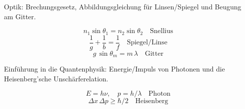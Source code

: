 \begin{runintext}
Optik: Brechungsgesetz, Abbildungsgleichung für Linsen/Spiegel und Beugung am Gitter.
\end{runintext}
\begin{formulabox}
\[ n_1\sin\theta_1 = n_2\sin\theta_2 \quad \text{Snellius} \]
\formulasep
\[ \frac{1}{g}+\frac{1}{b} = \frac{1}{f} \quad \text{Spiegel/Linse} \]
\formulasep
\[ g\,\sin\theta_m = m\,\lambda \quad \text{Gitter} \]
\end{formulabox}

\begin{runintext}
Einführung in die Quantenphysik: Energie/Impuls von Photonen und die Heisenberg'sche Unschärferelation.
\end{runintext}
\begin{formulabox}
\[ E = h\nu, \quad p = h/\lambda \quad \text{Photon} \]
\formulasep
\[ \Delta x\,\Delta p \ge \hbar/2 \quad \text{Heisenberg} \]
\end{formulabox}

